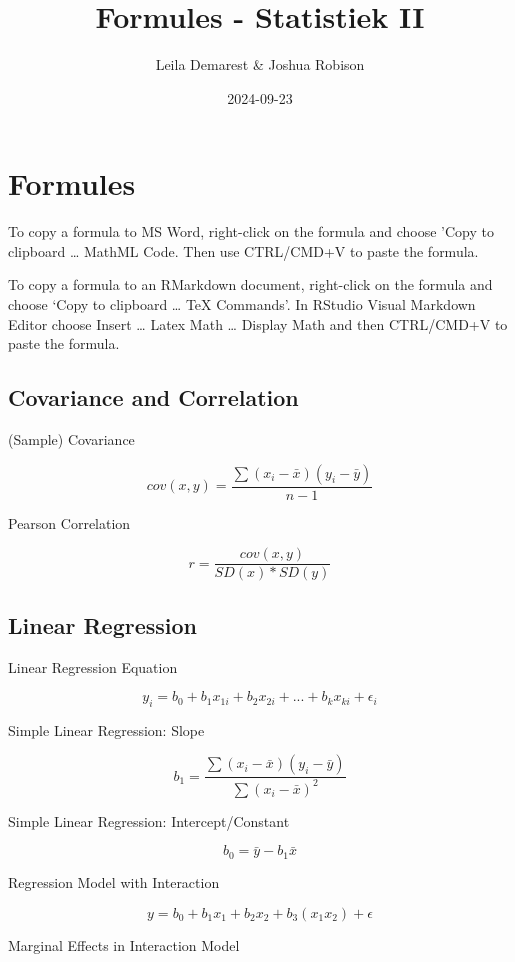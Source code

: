 \documentclass[
]{article}
\title{Formules - Statistiek II}
\author{Leila Demarest \& Joshua Robison}
\date{2024-09-23}
\begin{document}
\maketitle

{
\setcounter{tocdepth}{3}
\tableofcontents
}
\section{Formules}\label{sec-formulas}

To copy a formula to MS Word, right-click on the formula and choose
'Copy to clipboard \ldots{} MathML Code. Then use CTRL/CMD+V to paste
the formula.

To copy a formula to an RMarkdown document, right-click on the formula
and choose `Copy to clipboard \ldots{} TeX Commands'. In RStudio Visual
Markdown Editor choose Insert \ldots{} Latex Math \ldots{} Display Math
and then CTRL/CMD+V to paste the formula.

\subsection{Covariance and
Correlation}\label{covariance-and-correlation}

(Sample) Covariance

\[cov(x,y) = \frac{\sum (x_{i} - \bar{x})(y_{i} - \bar{y})}{n-1}\]

Pearson Correlation

\[r = \frac{cov(x,y)}{SD(x) * SD(y)}\]

\subsection{Linear Regression}\label{linear-regression}

Linear Regression Equation

\[y_{i} = b_{0} + b_{1}x_{1i} + b_{2}x_{2i} + ... + b_{k}x_{ki} + \epsilon_{i}\]

Simple Linear Regression: Slope

\[b_{1} = \frac{\sum(x_{i} - \bar{x})(y_{i} - \bar{y})}{\sum(x_{i} - \bar{x})^2}\]

Simple Linear Regression: Intercept/Constant

\[b_{0} = \bar{y} - b_{1}\bar{x}\]

Regression Model with Interaction

\[y = b_{0} + b_{1}x_{1} + b_{2}x_{2} + b_{3}(x_{1}x_{2}) + \epsilon\]

Marginal Effects in Interaction Model
\end{document}
